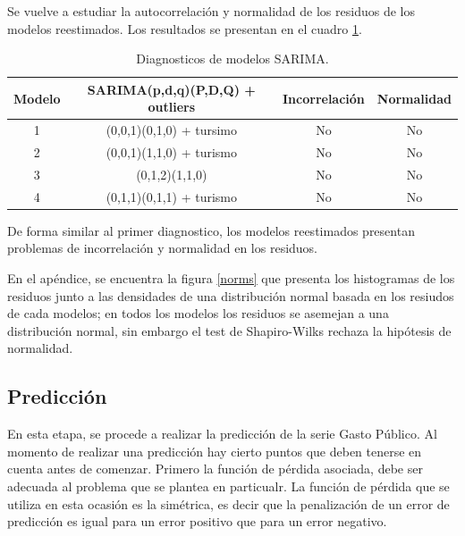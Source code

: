 \documentclass[
  12pt,
]{article}
\begin{document}
\begin{table}[H]
\centering
{}
\caption{Reestimación de modelos SARIMA con intervención de outliers.}
\label{tab:models3}
\end{table}

Se vuelve a estudiar la autocorrelación y normalidad de los residuos de
los modelos reestimados. Los resultados se presentan en el cuadro
\ref{tab:diagnostico2}.

\begin{table}[H]
\centering
\begin{tabular}{c c c c}
\hline
Modelo & SARIMA(p,d,q)(P,D,Q) + outliers & Incorrelación & Normalidad \\ \hline
1 & (0,0,1)(0,1,0) + tursimo & No & No \\ 
2 & (0,0,1)(1,1,0) + turismo & No & No \\ 
3 & (0,1,2)(1,1,0) & No & No \\ 
4 & (0,1,1)(0,1,1) + turismo & No & No \\ \hline
\end{tabular}
\caption{Diagnosticos de modelos SARIMA.}
\label{tab:diagnostico2}
\end{table}

De forma similar al primer diagnostico, los modelos reestimados
presentan problemas de incorrelación y normalidad en los residuos.

En el apéndice, se encuentra la figura \ref{norms} que presenta los
histogramas de los residuos junto a las densidades de una distribución
normal basada en los resiudos de cada modelos; en todos los modelos los
residuos se asemejan a una distribución normal, sin embargo el test de
Shapiro-Wilks rechaza la hipótesis de normalidad.

\hypertarget{predicciuxf3n}{%
\subsection{Predicción}\label{predicciuxf3n}}

En esta etapa, se procede a realizar la predicción de la serie Gasto
Público. Al momento de realizar una predicción hay cierto puntos que
deben tenerse en cuenta antes de comenzar. Primero la función de pérdida
asociada, debe ser adecuada al problema que se plantea en particualr. La
función de pérdida que se utiliza en esta ocasión es la simétrica, es
decir que la penalización de un error de predicción es igual para un
error positivo que para un error negativo.
\end{document}
